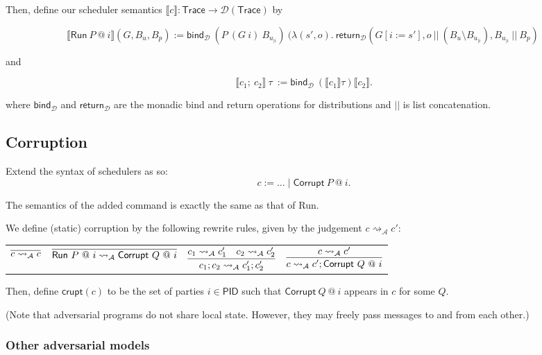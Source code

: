 \documentclass{article}
\newcommand{\PID}{\mathsf{PID}}
\newcommand{\D}{\mathcal{D}}
\begin{document}
Then, define our scheduler semantics $\llbracket c \rrbracket : \textsf{Trace} \to \D(\textsf{Trace})$ by

\[\llbracket \textsf{Run}\ P\ @\ i \rrbracket (G, B_u, B_p) := \textsf{bind}_{\D}\ (P\ (G\ i)\ B_{u_{| i}})\ (\lambda (s', o).\ \textsf{return}_{\D} (G[i := s'], o\ ||\ (B_u \setminus B_{u_{| i}}), B_{u_{| i}}\ ||\ B_p)\ \]

and

\[\llbracket c_1;\ c_2 \rrbracket\ \tau\ := \textsf{bind}_{\D}\ (\llbracket c_1 \rrbracket \tau) \llbracket c_2 \rrbracket.\]

where $\textsf{bind}_{\D}$ and $\textsf{return}_{\D}$ are the monadic bind and return operations for distributions and $||$ is list concatenation.

\subsection{Corruption}

Extend the syntax of schedulers as so:
\[ c := \dots \mid \textsf{Corrupt}\ P\ @\ i.\]

The semantics of the added command is exactly the same as that of \textsf{Run}.

We define (static) corruption by the following rewrite rules, given by the judgement $c \rightsquigarrow_{\mathcal{A}} c'$:

\begin{tabular}{cccc}
    $\infer{c \rightsquigarrow_{\mathcal{A}} c}{}$ & 
    $\infer{\textsf{Run}\ P\ @\ i \rightsquigarrow_{\mathcal{A}} \textsf{Corrupt}\ Q\ @\ i}{}$ &
    $\infer{c_1;c_2 \rightsquigarrow_{\mathcal{A}} c_1'; c_2'} {c_1 \rightsquigarrow_\mathcal{A} c_1' & c_2 \rightsquigarrow_\mathcal{A} c_2'}$ &
    $\infer{c \rightsquigarrow_{\mathcal{A}} c'; \textsf{Corrupt}\ Q\ @\ i}{c \rightsquigarrow_\mathcal{A} c'}$ \\
\end{tabular}

Then, define $\mathsf{crupt}(c)$ to be the set of parties $i \in \PID$ such that $\textsf{Corrupt}\ Q\ @\ i$ appears in $c$ for some $Q$.

(Note that adversarial programs do not share local state. However, they may freely pass messages to and from each other.)

\subsubsection{Other adversarial models}
\end{document}
